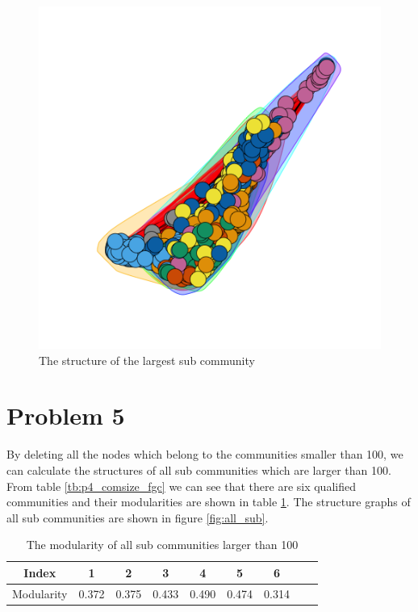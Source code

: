 \documentclass{article}
\begin{document}
\begin{figure}[htbp]
\centering
\includegraphics[width=.6\textwidth]{large_sub_com.png}
\caption{The structure of the largest sub community}
\label{fig:fgc_large}
\end{figure}

\section{Problem 5}
By deleting all the nodes which belong to the communities smaller than 100, we can calculate the structures of all sub communities which are larger than 100. From table \ref{tb:p4_comsize_fgc} we can see that there are six qualified communities and their modularities are shown in table \ref{tb:p4_subcom}. The structure graphs of all sub communities are shown in figure \ref{fig:all_sub}.

\begin {table}[htbp]
\caption{The modularity of all sub communities larger than 100}
\begin{adjustbox}{center}
\label{tb:p4_subcom}
\begin{tabular}{|c|c|c|c|c|c|c|c|c|}
\hline
Index&1&2&3&4&5&6\\
\hline
Modularity&0.372& 0.375& 0.433& 0.490& 0.474& 0.314\\
\hline
\end{tabular}
\end{adjustbox}
\end{table}
\end{document}
